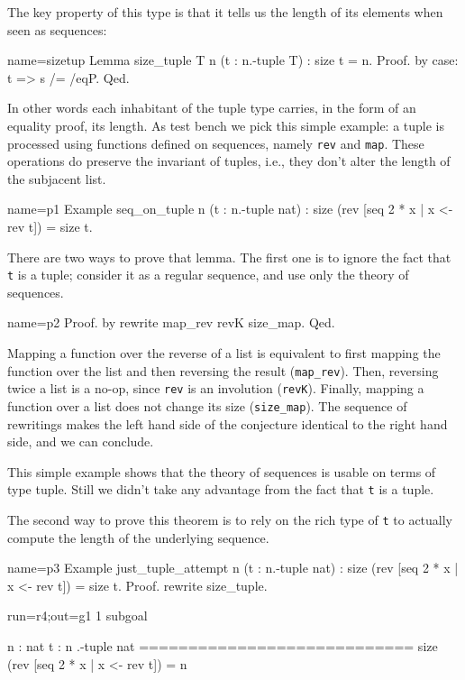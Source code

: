 The key property of this type is that it tells us the length of its
elements when seen as sequences:

\begin{coq}{name=sizetup}{}
Lemma size_tuple T n (t : n.-tuple T) : size t = n.
Proof. by case: t => s /= /eqP. Qed.
\end{coq}

In other words each inhabitant of the tuple type carries,
in the form of an equality proof, its length.  As test bench
we pick this simple example: a tuple is processed using
functions defined on sequences, namely \lstinline/rev/ and
\lstinline/map/.  These operations do preserve the invariant of
tuples, i.e., they don't alter the length of the subjacent list.

\begin{coq}{name=p1}{}
Example seq_on_tuple n (t : n.-tuple nat) :
  size (rev [seq 2 * x | x <- rev t]) = size t.
\end{coq}

There are two ways to prove that lemma.  The first one is
to ignore the fact that \lstinline/t/ is a tuple; consider it
as a regular sequence, and use only the theory of sequences.

\begin{coq}{name=p2}{}
Proof. by rewrite map_rev revK size_map. Qed.
\end{coq}

Mapping a function over the reverse of a list is equivalent to
first mapping the function over the list and then reversing the result
(\lstinline/map_rev/).  Then, reversing twice a list is a no-op, since
\lstinline/rev/ is an involution
(\lstinline/revK/).  Finally, mapping a function over a list does not
change its size (\lstinline/size_map/).  The sequence of rewritings
makes the left hand side of the conjecture identical to the right hand
side, and we can conclude.

This simple example shows that the theory of sequences is usable
on terms of type tuple.  Still we didn't take any advantage from
the fact that  \lstinline/t/ is a tuple.

The second way to prove this theorem is to rely on the rich type
of \lstinline/t/ to actually compute the length of the underlying
sequence.

\begin{coq}{name=p3}{}
Example just_tuple_attempt n (t : n.-tuple nat) :
  size (rev [seq 2 * x | x <- rev t]) = size t.
Proof. rewrite size_tuple.
\end{coq}
\begin{coqout}{run=r4;out=g1}{}
1 subgoal

 n : nat
 t : n .-tuple nat
 ============================
 size (rev [seq 2 * x | x <- rev t]) = n
\end{coqout}

